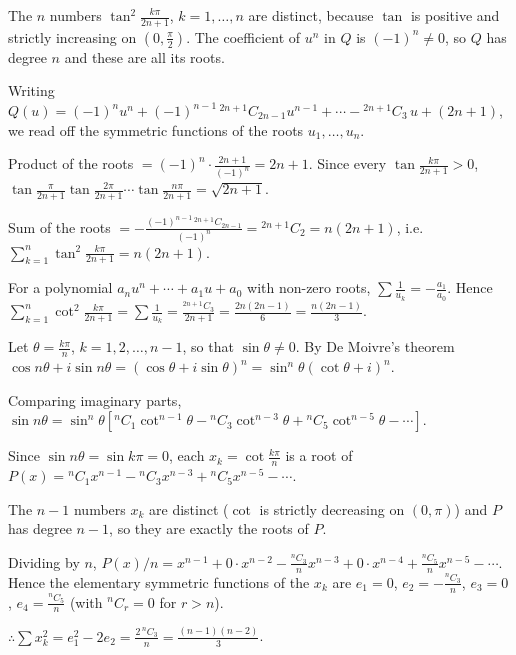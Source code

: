   The $n$ numbers $\tan^2\frac{k\pi}{2n + 1}$, $k = 1, \ldots, n$ are distinct, because $\tan$ is positive and
  strictly increasing on $\left(0, \frac{\pi}{2}\right)$. The coefficient of $u^n$ in $Q$ is $(-1)^n\neq 0$, so
  $Q$ has degree $n$ and these are all its roots.

  Writing $Q(u) = (-1)^nu^n + (-1)^{n - 1}\,{}^{2n + 1}C_{2n - 1}u^{n - 1} + \cdots - {}^{2n + 1}C_3\,u + (2n
  + 1)$, we read off the symmetric functions of the roots $u_1, \ldots, u_n$.

  Product of the roots $= (-1)^n\cdot\frac{2n + 1}{(-1)^n} = 2n + 1$. Since every $\tan\frac{k\pi}{2n + 1} > 0$,
  $\tan\frac{\pi}{2n + 1}\tan\frac{2\pi}{2n + 1}\cdots\tan\frac{n\pi}{2n + 1} = \sqrt{2n + 1}$.

  Sum of the roots $= -\frac{(-1)^{n - 1}\,{}^{2n + 1}C_{2n - 1}}{(-1)^n} = {}^{2n + 1}C_2 = n(2n + 1)$, i.e.
  $\displaystyle\sum_{k = 1}^{n}\tan^2\frac{k\pi}{2n + 1} = n(2n + 1)$.

  For a polynomial $a_nu^n + \cdots + a_1u + a_0$ with non-zero roots, $\displaystyle\sum\frac{1}{u_k} =
  -\frac{a_1}{a_0}$. Hence $\displaystyle\sum_{k = 1}^{n}\cot^2\frac{k\pi}{2n + 1} = \sum\frac{1}{u_k}
  = \frac{{}^{2n + 1}C_3}{2n + 1} = \frac{2n(2n - 1)}{6} = \frac{n(2n - 1)}{3}$.
\item Let $\theta = \frac{k\pi}{n}$, $k = 1, 2, \ldots, n - 1$, so that $\sin\theta\neq 0$. By De Moivre's
  theorem $\cos n\theta + i\sin n\theta = (\cos\theta + i\sin\theta)^n = \sin^n\theta(\cot\theta + i)^n$.

  Comparing imaginary parts, $\sin n\theta = \sin^n\theta\left[{}^nC_1\cot^{n - 1}\theta - {}^nC_3\cot^{n -
    3}\theta + {}^nC_5\cot^{n - 5}\theta - \cdots\right]$.

  Since $\sin n\theta = \sin k\pi = 0$, each $x_k = \cot\frac{k\pi}{n}$ is a root of $P(x) = {}^nC_1x^{n - 1}
  - {}^nC_3x^{n - 3} + {}^nC_5x^{n - 5} - \cdots$.

  The $n - 1$ numbers $x_k$ are distinct ($\cot$ is strictly decreasing on $(0, \pi)$) and $P$ has degree $n -
  1$, so they are exactly the roots of $P$.

  Dividing by $n$, $P(x)/n = x^{n - 1} + 0\cdot x^{n - 2} - \frac{{}^nC_3}{n}x^{n - 3} + 0\cdot x^{n - 4}
  + \frac{{}^nC_5}{n}x^{n - 5} - \cdots$. Hence the elementary symmetric functions of the $x_k$ are $e_1 = 0$,
  $e_2 = -\frac{{}^nC_3}{n}$, $e_3 = 0$, $e_4 = \frac{{}^nC_5}{n}$ (with ${}^nC_r = 0$ for $r > n$).

  $\therefore \displaystyle\sum x_k^2 = e_1^2 - 2e_2 = \frac{2\,{}^nC_3}{n} = \frac{(n - 1)(n - 2)}{3}$.

